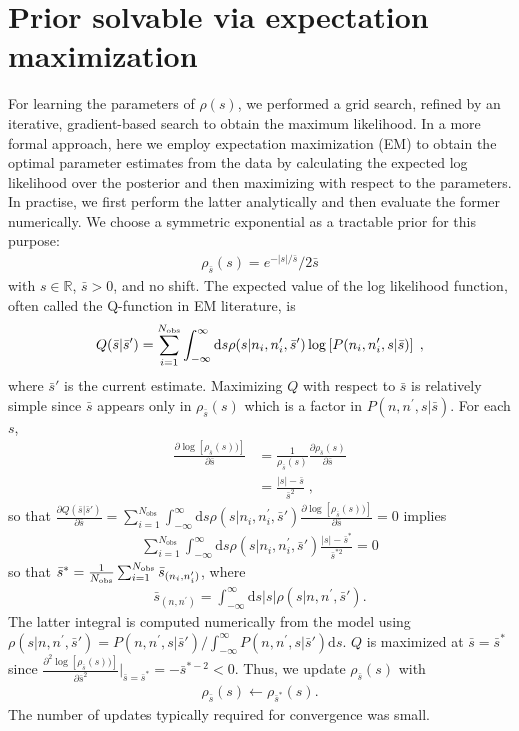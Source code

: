 \documentclass[letterpaper,english,prl,reprint,longbibliography]{revtex4-1} %
\begin{document}
\section{Prior solvable via expectation maximization}\label{sec:EM}
For learning the parameters of $\rho(s)$, we performed a grid search, refined by an iterative, gradient-based search to obtain the maximum likelihood. In a more formal approach, here we employ expectation maximization (EM) to obtain the optimal parameter estimates from the data by calculating the expected log likelihood over the posterior and then maximizing with respect to the parameters. In practise, we first perform the latter analytically and then evaluate the former numerically. We choose a symmetric exponential as a tractable prior for this purpose:
\begin{align}
	\rho_{\bar{s}}(s)=e^{-|s|/\bar{s}}/2\bar{s}
\end{align}
with $s\in\mathbb{R}$, $\bar{s}>0$, and no shift. The expected value of the log likelihood function, often called the Q-function in EM literature, is 
 \begin{align}
 Q(\bar{s}|\bar{s}')=\sum_{i=1}^{N_\textrm{\textrm{obs}}}\int_{-\infty}^{\infty}\mathrm{d}s\rho(s|n_i,n_i^{\prime},\bar{s}')\log \left[P(n_i,n_i^{\prime},s|\bar{s})\right]\;,
 \end{align}
 where $\bar{s}'$ is the current estimate.
 Maximizing $Q$  with respect to $\bar{s}$ is relatively simple since $\bar{s}$ appears only in $\rho_{\bar{s}}(s)$  which is a factor in $P(n,n^{\prime},s|\bar{s})$. For each $s$,
 \begin{align}
 \frac{\partial \log \left[\rho_{\bar{s}}(s))\right] }{\partial\bar{s}} &=\frac{1}{\rho_{\bar{s}}(s)} \frac{\partial\rho_{\bar{s}}(s)}{\partial\bar{s}}\\&=\frac{|s|-\bar{s}}{\bar{s}^2}\;,
 \end{align}
so that $  \frac{\partial Q(\bar{s}|\bar{s}')}{\partial\bar{s}}=\sum_{i=1}^{N_\textrm{obs}}\int_{-\infty}^{\infty}\mathrm{d}s\rho(s|n_i,n_i^{\prime},\bar{s}')\frac{\partial \log \left[\rho_{\bar{s}}(s))\right] }{\partial\bar{s}} =0$ implies
\begin{align}
  \sum_{i=1}^{N_\textrm{obs}}\int_{-\infty}^{\infty}\mathrm{d}s\rho(s|n_i,n_i^{\prime},\bar{s}')\frac{|s|-\bar{s}^*}{\bar{s}^{*2}} =0
\end{align}
so that $\bar{s}^*=\frac{1}{N_\textrm{\textrm{obs}}}\sum_{i=1}^{N_\textrm{obs}}\bar{s}_{(n_i,n_i^{\prime})}$, where 
\begin{align}
\bar{s}_{(n,n^{\prime})}=\int_{-\infty}^{\infty}\mathrm{d}s|s|\rho(s|n,n^{\prime},\bar{s}').
\end{align}
The latter integral is computed numerically from the model using $\rho(s|n,n^{\prime},\bar{s}')=P(n,n^{\prime},s|\bar{s}')/\int_{-\infty}^{\infty}P(n,n^{\prime},s|\bar{s}')\mathrm{d}s	$. $Q$ is maximized at $\bar{s}=\bar{s}^*$ since  $ \frac{\partial^2 \log \left[\rho_{\bar{s}}(s))\right] }{\partial\bar{s}^2}\bigg|_{\bar{s}=\bar{s}^*}=-\bar{s}^{*-2} <0$. Thus, we update $\rho_{\bar{s}}(s)$ with 
\begin{align}
\rho_{\bar{s}}(s)\leftarrow\rho_{\bar{s}^*}(s).
\end{align}
The number of updates typically required for convergence was small.
\end{document}
